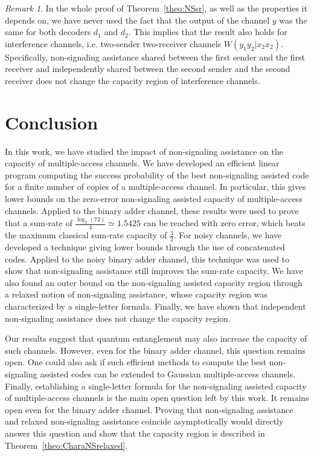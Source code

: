 \documentclass[11pt]{article}
\theoremstyle{definition}
\theoremstyle{remark}
\newtheorem*{rk}{Remark}
\begin{document}
\begin{rk}
  In the whole proof of Theorem~\ref{theo:NSsr}, as well as the properties it depends on, we have never used the fact that the output of the channel $y$ was the same for both decoders $d_1$ and $d_2$. This implies that the result also holds for interference channels, i.e. two-sender two-receiver channels $W(y_1y_2|x_2x_2)$. Specifically, non-signaling assistance shared between the first sender and the first receiver and independently shared between the second sender and the second receiver does not change the capacity region of interference channels.
\end{rk}
  
\section{Conclusion}
In this work, we have studied the impact of non-signaling assistance on the capacity of multiple-access channels. We have developed an efficient linear program computing the success probability of the best non-signaling assisted code for a finite number of copies of a multiple-access channel. In particular, this gives lower bounds on the zero-error non-signaling assisted capacity of multiple-access channels.
Applied to the binary adder channel, these results were used to prove that a sum-rate of $\frac{\log_2(72)}{4} \simeq 1.5425$ can be reached with zero error, which beats the maximum classical sum-rate capacity of $\frac{3}{2}$. For noisy channels, we have developed a technique giving lower bounds through the use of concatenated codes. Applied to the noisy binary adder channel, this technique was used to show that non-signaling assistance still improves the sum-rate capacity. We have also found an outer bound on the non-signaling assisted capacity region through a relaxed notion of non-signaling assistance, whose capacity region was characterized by a single-letter formula. Finally, we have shown that independent non-signaling assistance does not change the capacity region.

Our results suggest that quantum entanglement may also increase the capacity of such channels. However, even for the binary adder channel, this question remains open. One could also ask if such efficient methods to compute the best non-signaling assisted codes can be extended to Gaussian multiple-access channels. Finally, establishing a single-letter formula for the non-signaling assisted capacity of multiple-access channels is the main open question left by this work. It remains open even for the binary adder channel. Proving that non-signaling assistance and relaxed non-signaling assistance coincide asymptotically would directly answer this question and show that the capacity region is described in Theorem~\ref{theo:CharaNSrelaxed}.
\end{document}
